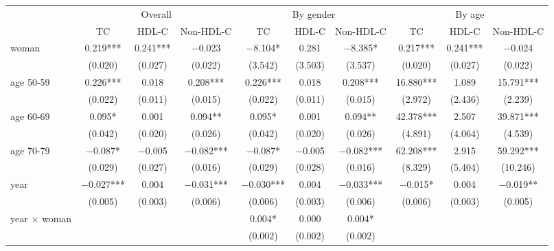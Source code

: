 
\begin{tabular}[t]{lccccccccc}
\toprule
\multicolumn{1}{c}{ } & \multicolumn{3}{c}{Overall} & \multicolumn{3}{c}{By gender} & \multicolumn{3}{c}{By age} \\
\cmidrule(l{3pt}r{3pt}){2-4} \cmidrule(l{3pt}r{3pt}){5-7} \cmidrule(l{3pt}r{3pt}){8-10}
  & TC & HDL-C & Non-HDL-C & TC  & HDL-C  & Non-HDL-C  & TC   & HDL-C   & Non-HDL-C  \\
\midrule
woman & \num{0.219}*** & \num{0.241}*** & \num{-0.023} & \num{-8.104}* & \num{0.281} & \num{-8.385}* & \num{0.217}*** & \num{0.241}*** & \num{-0.024}\\
 & (\num{0.020}) & (\num{0.027}) & (\num{0.022}) & (\num{3.542}) & (\num{3.503}) & (\num{3.537}) & (\num{0.020}) & (\num{0.027}) & (\num{0.022})\\
age 50-59 & \num{0.226}*** & \num{0.018} & \num{0.208}*** & \num{0.226}*** & \num{0.018} & \num{0.208}*** & \num{16.880}*** & \num{1.089} & \num{15.791}***\\
 & (\num{0.022}) & (\num{0.011}) & (\num{0.015}) & (\num{0.022}) & (\num{0.011}) & (\num{0.015}) & (\num{2.972}) & (\num{2.436}) & (\num{2.239})\\
age 60-69 & \num{0.095}* & \num{0.001} & \num{0.094}** & \num{0.095}* & \num{0.001} & \num{0.094}** & \num{42.378}*** & \num{2.507} & \num{39.871}***\\
 & (\num{0.042}) & (\num{0.020}) & (\num{0.026}) & (\num{0.042}) & (\num{0.020}) & (\num{0.026}) & (\num{4.891}) & (\num{4.064}) & (\num{4.539})\\
age 70-79 & \num{-0.087}* & \num{-0.005} & \num{-0.082}*** & \num{-0.087}* & \num{-0.005} & \num{-0.082}*** & \num{62.208}*** & \num{2.915} & \num{59.292}***\\
 & (\num{0.029}) & (\num{0.027}) & (\num{0.016}) & (\num{0.029}) & (\num{0.028}) & (\num{0.016}) & (\num{8.329}) & (\num{5.404}) & (\num{10.246})\\
year & \num{-0.027}*** & \num{0.004} & \num{-0.031}*** & \num{-0.030}*** & \num{0.004} & \num{-0.033}*** & \num{-0.015}* & \num{0.004} & \num{-0.019}**\\
 & (\num{0.005}) & (\num{0.003}) & (\num{0.006}) & (\num{0.006}) & (\num{0.003}) & (\num{0.006}) & (\num{0.006}) & (\num{0.003}) & (\num{0.005})\\
year $\times$ woman &  &  &  & \num{0.004}* & \num{0.000} & \num{0.004}* &  &  & \\
 &  &  &  & (\num{0.002}) & (\num{0.002}) & (\num{0.002}) &  &  & \\

\end{tabular}
